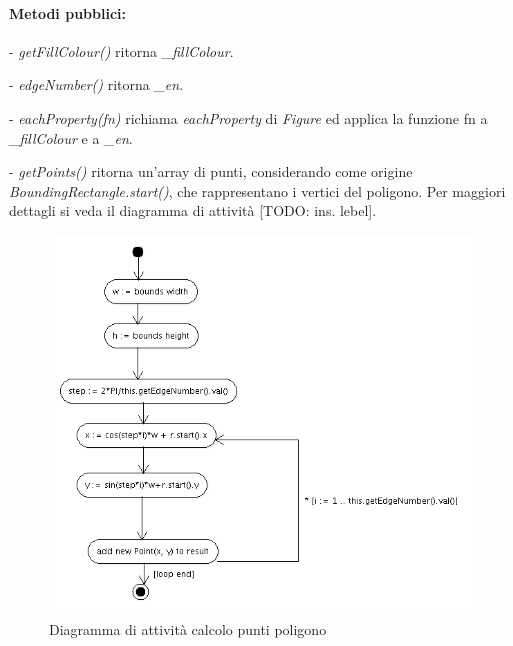 \paragraph{Metodi pubblici:}
\begin{elencopuntato}[\subsubsecindent]
\item[-] \textit{getFillColour()} ritorna \textit{{\_}fillColour}.
\item[-] \textit{edgeNumber()} ritorna \textit{{\_}en}.
\item[-] \textit{eachProperty(fn)} richiama \textit{eachProperty} di \textit{Figure} ed applica la funzione fn a \textit{{\_}fillColour} e a \textit{{\_en}}.
\item[-] \textit{getPoints()} ritorna un'array di punti, considerando come origine \textit{BoundingRectangle.start()}, che rappresentano i vertici del poligono. Per maggiori dettagli si veda il diagramma di attivit\`a [TODO: ins. lebel].

\begin{figure}[!ht]
\centering
\includegraphics[scale=0.5]{polygonpoints.png}
\caption{Diagramma di attivit\`a calcolo punti poligono}
\end{figure}


\end{elencopuntato}
